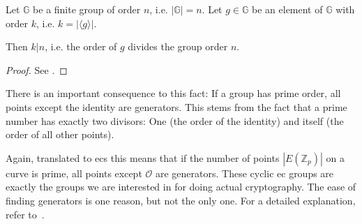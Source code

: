 \begin{theorem}\cite{katz_introduction_2015}
    Let $\mathbb{G}$ be a finite group of order $n$, i.e. $|\mathbb{G}| = n$.
    Let $g \in \mathbb{G}$ be an element of $\mathbb{G}$ with order $k$, i.e. $k = |\langle g \rangle |$.

    Then $k|n$, i.e. the order of $g$ divides the group order $n$.
\end{theorem}
\begin{proof}
    See \cite*[Proposition 8.54]{katz_introduction_2015}.
\end{proof}

There is an important consequence to this fact: If a group has prime order, all points except the identity are generators.
This stems from the fact that a prime number has exactly two divisors: One (the order of the identity) and itself (the order of all other points).

Again, translated to \glspl{ec} this means that if the number of points $|E(\mathbb{Z}_p)|$ on a curve is prime, all points except $\mathcal{O}$ are generators.
These cyclic \gls{ec} groups are exactly the groups we are interested in for doing actual cryptography.
The ease of finding generators is one reason, but not the only one. 
For a detailed explanation, refer to~\cite[p.~321]{katz_introduction_2015}.






